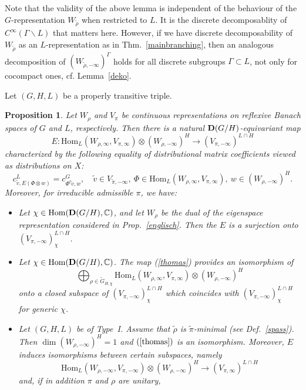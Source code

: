 \documentclass[10]{amsart}
\newtheorem{pro}[thm]{Proposition}
\theoremstyle{remark}
\theoremstyle{definition}
\numberwithin{equation}{section}
\newcommand{\C}{\mathbb{C}}           %
\newcommand{\Hom}{\mathrm{Hom}}
\newcommand{\be}{\begin{equation}}
\begin{document}
{Note that the validity of the above lemma is independent of the behaviour of the $G$-representation $W_{\tilde\rho}$ when restricted to $L$. It is the discrete decomposablity of
$C^\infty(\Gamma\backslash L)$ that matters here. However, if we have discrete decomposability of $W_{\tilde\rho}$ as an $L$-representation as in Thm.~\ref{mainbranching}, then
an analogous decomposition of  $(W_{\tilde \rho,-\infty})^\Gamma$ holds for all discrete subgroups $\Gamma\subset L$, not only for cocompact ones, cf. Lemma~\ref{deko}.

Let $(G,H,L)$ be a properly transitive triple. 
\begin{pro}\label{paulklee}
Let $W_\rho$ and $V_\pi$ be continuous representations on reflexive Banach spaces of $G$ and $L$, respectively.
Then there is a natural ${\bf D}(G/H)$-equivariant map 
\be\label{thomas}   E: \Hom_L(W_{\rho,\infty},V_{\pi,\infty})\otimes (W_{\rho,-\infty})^H\longrightarrow  (V_{\pi,-\infty})^{L\cap H}\end{equation}
characterized by the following equality of distributional matrix coefficients viewed as distributions on $X$:
$$  c^L_{\tilde v,E(\Phi\otimes w)} =c^G_{\Phi^t\tilde v, w},\quad \tilde v\in V_{\tilde\pi,-\infty},\  \Phi\in \Hom_L(W_{\rho,\infty},V_{\pi,\infty}), \ w\in (W_{\rho,-\infty})^H.$$
Moreover, for irreducible admissible $\pi$, we have:
\begin{itemize}
\item[(i)] Let $\chi\in\Hom({\bf D}(G/H),\C)$, and let $W_\rho$ be the dual of the eigenspace representation considered in Prop.~\ref{englisch}. Then the $E$ is a surjection
onto $(V_{\pi,-\infty})^{L\cap H}_\chi$. 
\item[(ii)] Let $\chi\in\Hom({\bf D}(G/H),\C)$. The map (\ref{thomas}) provides an isomorphism of
$$ \bigoplus_{\rho\in \widetilde G_{H,\chi}} \Hom_L(W_{\rho,\infty},V_{\pi,\infty})\otimes (W_{\rho,-\infty})^H$$
onto a closed subspace of  $(V_{\pi,-\infty})^{L\cap H}_\chi $ which coincides with $(V_{\pi,-\infty})^{L\cap H}_\chi $ for generic $\chi$.
\item[(iii)] Let $(G,H,L)$ be of Type~I. Assume that $\tilde\rho$ is $\tilde\pi$-minimal (see Def.~\ref{spass}). Then $\dim (W_{\rho,-\infty})^H=1$ and $(\ref{thomas})$ is an isomorphism.
Moreover, $E$ induces isomorphisms between certain subspaces, namely
$$\Hom_L(W_{\rho,-\infty},V_{\pi,-\infty})\otimes (W_{\rho,-\infty})^H\longrightarrow  (V_{\pi,\infty})^{L\cap H} $$
and, if in addition $\pi$ and $\rho$ are unitary,

\end{itemize}
\end{pro}}
\end{document}
